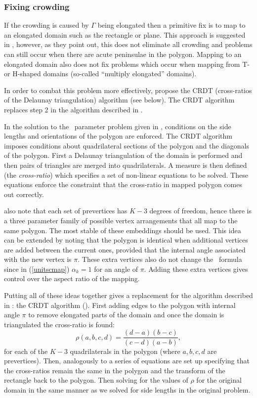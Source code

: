 \subsubsection{Fixing crowding}
\label{sc-crdt}

If the crowding is caused by $\Gamma$ being elongated then a  primitive fix is to map to an elongated domain such as the rectangle or plane. This approach is suggested in , however, as they point out, this does not eliminate all crowding and problems can still occur when there are acute peninsulae in the polygon. Mapping to an elongated domain also does not fix problems which occur when mapping from T- or H-shaped domains (so-called ``multiply elongated'' domains).

In order to combat this problem more effectively,  propose the CRDT (cross-ratios of the Delaunay triangulation) algorithm (see below). The CRDT algorithm replaces step 2 in the algorithm described in . 

In the solution to the \sch\ parameter problem given in , conditions on the side lengths and orientations of the polygon are enforced. The CRDT algorithm imposes conditions about quadrilateral sections of the polygon and the diagonals of the polygon. First a Delaunay triangulation of the domain is performed and then pairs of triangles are merged into quadrilaterals. A measure is then defined (the \emph{cross-ratio}) which specifies a set of non-linear equations to be solved. These equations enforce the constraint that the cross-ratio in mapped polygon comes out correctly. 

 also note that each set of prevertices has $K-3$ degrees of freedom, hence there is a three parameter family of possible vertex arrangements that all map to the same polygon. The most stable of these embeddings should be used. This idea can be extended by noting that the polygon is identical when additional vertices are added between the current ones, provided that the internal angle associated with the new vertex is $\pi$. These extra vertices also do not change the \sch\ formula since in (\ref{unitscmap}) $\alpha_k=1$ for an angle of $\pi$. Adding these extra vertices gives control over the aspect ratio of the mapping.

Putting all of these ideas together gives a replacement for the algorithm described in : the CRDT algorithm (\cite[pp. 30-39]{driscoll}). First adding edges to the polygon with internal angle $\pi$ to remove elongated parts of the domain and once the domain is triangulated the cross-ratio is found:
\begin{equation}
\rho(a,b,c,d) = \frac{(d-a)(b-c)}{(c-d)(a-b)},
\end{equation}
for each of the $K-3$ quadrilaterals in the polygon (where $a,b,c,d$ are prevertices). Then, analogously to  a series of equations are set up specifying that the cross-ratios remain the same in the polygon and the transform of the rectangle back to the polygon. Then solving for the values of $\rho$ for the original domain in the same manner as we solved for side lengths in the original problem. 

